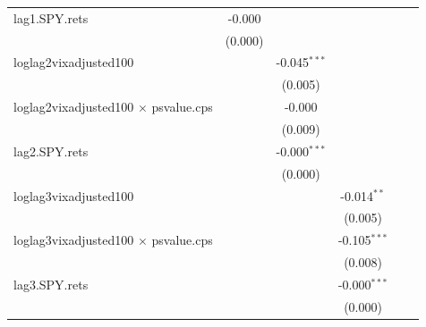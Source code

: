\documentclass[11pt,a4paper,oldfontcommands]{memoir}
\begin{document}
{\begin{footnotesize}
\begin{longtable}{l*{5}{c}}
lag1.SPY.rets       &      -0.000         &                     &                     &                     &                     \\
                    &     (0.000)         &                     &                     &                     &                     \\

 
loglag2vixadjusted100&                     &      -0.045$^{***}$&                     &                     &                     \\
                    &                     &     (0.005)         &                     &                     &                     \\
 
loglag2vixadjusted100 $\times$ psvalue.cps&                     &      -0.000         &                     &                     &                     \\
                    &                     &     (0.009)         &                     &                     &                     \\
 
lag2.SPY.rets       &                     &      -0.000$^{***}$&                     &                     &                     \\
                    &                     &     (0.000)         &                     &                     &                     \\
 
loglag3vixadjusted100&                     &                     &      -0.014$^{**}$ &                     &                     \\
                    &                     &                     &     (0.005)         &                     &                     \\
 
loglag3vixadjusted100 $\times$ psvalue.cps&                     &                     &      -0.105$^{***}$&                     &                     \\
                    &                     &                     &     (0.008)         &                     &                     \\
 
lag3.SPY.rets       &                     &                     &      -0.000$^{***}$&                     &                     \\
                    &                     &                     &     (0.000)         &                     &                     \\
 

\end{longtable}
\end{footnotesize}}
\end{document}
